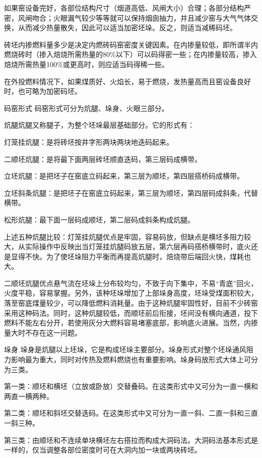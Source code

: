 \documentclass{ctexbook}
\begin{document}
如果窑设备完好，各部位结构尺寸（烟道高低、风闸大小）合理；各部分结构严密，风闸吻合；火眼漏气较少等等就可以保持烟囱抽力，并且减少窑与大气气体交换，从而减少热量散失，因此可以适当加密坯垛。反之，则适当减稀码坯。

砖坯内掺燃料量多少是决定内燃砖码窑密度关键因素。在内掺量较低，即所谓半内燃烧砖时（掺入焙烧所需热量的80\%以下）可以码得密一些；在内掺量较高，掺入焙烧所需热量100\%或更高时，则应适当码得稀一些。

在外投燃料情况下，如果煤质好、火焰长，易于燃烧，发热量高而且窑设备良好时，也可略为加密码坯。

码窑形式 码窑形式可分为炕腿、垛身、火眼三部分。

炕腿炕腿又称腿子，为整个坯垛最层基础部分。它的形式有：

灯笼挂炕腿：是将砖坯按井字形两块两块地迭码起来。

二顺坯炕腿：是将最下面两层砖坯顺直迭码，第三层码成横带。

立坯炕腿：是把坯子在窑底立码起来，第三层为顺坯，第四层搭桥码成横带。

立坯斜条炕腿：是把坯子在窑底立码起来，第三层为顺坯，第四层码成斜条，代替横带。

松形炕腿：最下面一层码成顺坯，第二层码成斜条构成炕腿。

上述五种炕腿比较：灯笼挂炕腿优点是牢固，容易码放，但缺点是横坯多阻力较大，从实际操作中反映出当灯笼挂炕腿码放五层，第六层再码搭桥横带时，底火还是显得不快。为了使坯垛阻力平衡而再提高炕腿时，焙烧带后端回火快，煤耗也大。

二顺坯炕腿优点悬气流在坯垛上分布较均匀，不致于向下集中，不易“青底”回火，火度平稳，容易掌握。另外，该种坯垛增加了上部垛身高度，坯垛受煤面积较大，落至窑底煤量较少，可以降低燃料消耗量。由于这种炕腿牢固性好，目前不少砖窑采用这种码法。同时，这种炕腿较低，而顺坯前后衔接，坯间没有横向通道，投下燃料不能左右分开，若使用灰分大燃料容易堵塞底部，影响底火进展。当然，内掺量大时不存在这一问题。

垛身 垛身是炕腿以上坯垛，它是构成坯垛主要部分。垛身形式对整个坯垛通风阻力影响最为重大，同时对传热及燃料燃烧也有重要影响。垛身码放形式大体上可分为三类。

第一类：顺坯和横坯（立放或卧放）交替叠码。在这类形式中又可分为一直一横和两直一横两种。

第二类：顺坯和斜坯交替迭码。在这类形式中又可分为一直一斜、二直一斜和三直一斜三种。

第三类：由顺坯和不连续单块横坯左右搭拉而构成大洞码法。大洞码法基本形式是一样的，仅当调整各部位密度时可在大洞内加一块或两块砖坯。
\end{document}
